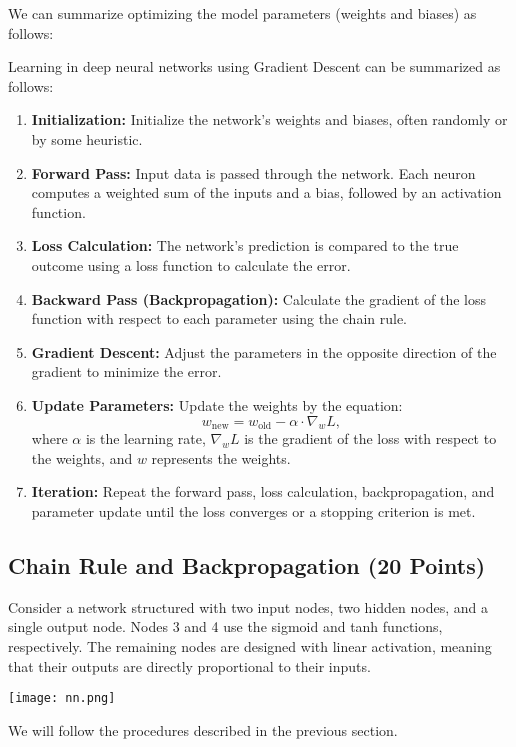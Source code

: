 We can summarize optimizing the model parameters (weights and biases) as follows:

Learning in deep neural networks using Gradient Descent can be summarized as follows:
\begin{enumerate}
    \item \textbf{Initialization:} Initialize the network’s weights and biases, often randomly or by some heuristic.
    \item \textbf{Forward Pass:} Input data is passed through the network. Each neuron computes a weighted sum of the inputs and a bias, followed by an activation function.
    \item \textbf{Loss Calculation:} The network’s prediction is compared to the true outcome using a loss function to calculate the error.
    \item \textbf{Backward Pass (Backpropagation):} Calculate the gradient of the loss function with respect to each parameter using the chain rule.
    \item \textbf{Gradient Descent:} Adjust the parameters in the opposite direction of the gradient to minimize the error.
    \item \textbf{Update Parameters:} Update the weights by the equation:
    \[
    w_{\text{new}} = w_{\text{old}} - \alpha \cdot \nabla_w L,
    \]
    where $\alpha$ is the learning rate, $\nabla_w L$ is the gradient of the loss with respect to the weights, and $w$ represents the weights.
    \item \textbf{Iteration:} Repeat the forward pass, loss calculation, backpropagation, and parameter update until the loss converges or a stopping criterion is met.
\end{enumerate}

\subsection{Chain Rule and Backpropagation (20 Points)}
Consider a network structured with two input nodes, two hidden nodes, and a single output node. Nodes 3 and 4 use the sigmoid and tanh functions, respectively. The remaining nodes are designed with linear activation, meaning that their outputs are directly proportional to
their inputs.

\begin{center}
    
\texttt{[image: nn.png]}
\end{center}

We will follow the procedures described in the previous section.


